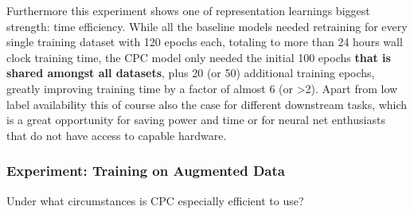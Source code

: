 Furthermore this experiment shows one of representation learnings biggest strength: time efficiency. While all the baseline models needed retraining for every single training dataset with 120 epochs each, totaling to more than 24 hours wall clock training time, the CPC model only needed the initial 100 epochs \textbf{that is shared amongst all datasets}, plus 20 (or 50) additional training epochs, greatly improving training time by a factor of almost 6 (or >2). Apart from low label availability this of course also the case for different downstream tasks, which is a great opportunity for saving power and time or for neural net enthusiasts that do not have access to capable hardware.

\subsubsection{Experiment: Training on Augmented Data} \label{sec:augmented}
Under what circumstances is CPC especially efficient to use?

